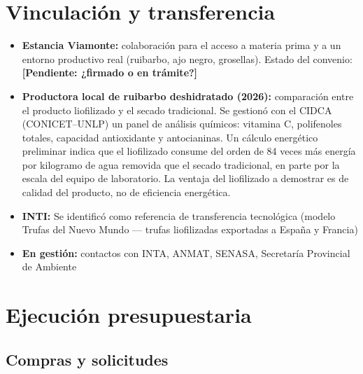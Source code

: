 \documentclass[12pt, a4paper]{article}
\newcommand{\pend}[1]{\textcolor{red!70!black}{\textbf{[Pendiente: #1]}}}
\begin{document}
\section{Vinculación y transferencia}

\begin{itemize}[nosep]
    \item \textbf{Estancia Viamonte:} colaboración para el acceso a materia prima y a un entorno productivo real (ruibarbo, ajo negro, grosellas). Estado del convenio: \pend{¿firmado o en trámite?}
    \item \textbf{Productora local de ruibarbo deshidratado (2026):} comparación entre el producto liofilizado y el secado tradicional. Se gestionó con el CIDCA (CONICET--UNLP) un panel de análisis químicos: vitamina C, polifenoles totales, capacidad antioxidante y antocianinas. Un cálculo energético preliminar indica que el liofilizado consume del orden de 84 veces más energía por kilogramo de agua removida que el secado tradicional, en parte por la escala del equipo de laboratorio. La ventaja del liofilizado a demostrar es de calidad del producto, no de eficiencia energética.
    \item \textbf{INTI:} Se identificó como referencia de transferencia tecnológica (modelo Trufas del Nuevo Mundo --- trufas liofilizadas exportadas a España y Francia)
    \item \textbf{En gestión:} contactos con INTA, ANMAT, SENASA, Secretaría Provincial de Ambiente
\end{itemize}

\section{Ejecución presupuestaria}

\subsection{Compras y solicitudes}
\end{document}
